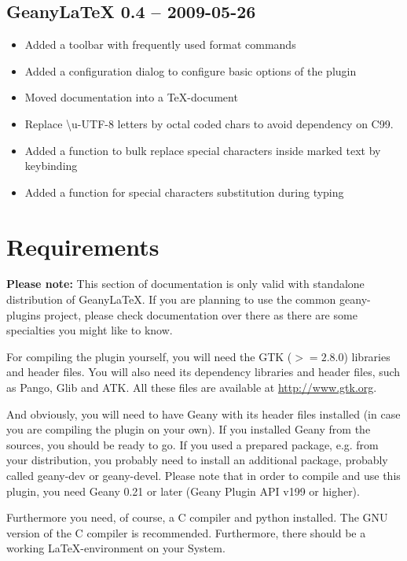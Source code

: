 \documentclass[%
paper=a4,%
fontsize=11pt,%
twoside=false,%
DIV18,%
headsepline,%
plainheadsepline,%
footsepline,%
plainfootsepline,%
bibliography=totoc,%
listof=totoc,%
BCOR10mm,%
parskip=half,%
openany,%
]{scrartcl}
\begin{document}
\subsection{Geany\LaTeX{} 0.4 -- 2009-05-26}
\begin{itemize}
	\item Added a toolbar with frequently used format commands
	\item Added a configuration dialog to configure basic options
          of the plugin
	\item Moved documentation into a \TeX{}-document
	\item Replace \textbackslash{}u-UTF-8 letters by octal coded
          chars to avoid dependency on C99.
	\item Added a function to bulk replace special characters
          inside marked text by keybinding
	\item Added a function for special characters substitution during typing
\end{itemize}

\newpage
\section{Requirements}

\small{\textbf{Please note:} This section of documentation is only
valid with standalone distribution of Geany\LaTeX{}. If you are
planning to use the common geany-plugins project, please check
documentation over there as there are some specialties you might
like to know.}

For compiling the plugin yourself, you will need the GTK ($>= 2.8.0$)
libraries and header files. You will also need its dependency
libraries and header files, such as Pango, Glib and ATK. All these
files are available at \url{http://www.gtk.org}.

And obviously, you will need to have Geany with its header files
installed (in case you are compiling the plugin on your own). If you
installed Geany from the sources, you should be ready to go. If you
used a prepared package, e.g. from your distribution, you probably
need to install an additional package, probably called geany-dev or
geany-devel. Please note that in order to compile and use this
plugin, you need Geany 0.21 or later (Geany Plugin API v199 or
higher).

Furthermore you need, of course, a C compiler and python installed.
The GNU version of the C compiler is recommended. Furthermore, there
should be a working \LaTeX-environment on your System.
\end{document}
